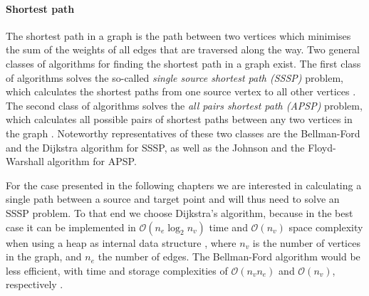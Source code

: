 \paragraph{Shortest path}
The shortest path in a graph is the path between two vertices which minimises the sum of the weights
of all edges that are traversed along the way.
Two general classes of algorithms for finding the shortest path in a graph exist.
The first class of algorithms solves the so-called \textit{single source shortest path (SSSP)} problem,
which calculates the shortest paths from one source vertex to all other vertices \cite[pp. 273-297]{Erickson2019}.
The second class of algorithms solves the \textit{all pairs shortest path (APSP)} problem, which calculates
all possible pairs of shortest paths between any two vertices in the graph \cite[pp. 309-320]{Erickson2019}.
Noteworthy representatives of these two classes are the Bellman-Ford \cite[pp. 11-14]{FUH_algo_graphs_2021} 
and the Dijkstra algorithm \cite[pp. 14-18]{FUH_algo_graphs_2021} for SSSP, 
as well as the Johnson \cite[pp. 19-21]{FUH_algo_graphs_2021} 
and the Floyd-Warshall algorithm \cite[pp. 21-24]{FUH_algo_graphs_2021} for APSP.

For the case presented in the following chapters we are interested in calculating a single path between 
a source and target point and will thus need to solve an SSSP problem.
To that end we choose Dijkstra's algorithm, because in the best case it can be implemented 
in $\mathcal{O}\left( n_e \log_2 n_v \right)$ time and $\mathcal{O}\left( n_v \right)$ space 
complexity when using a heap as internal data structure \cite[pp. 17-18]{FUH_algo_graphs_2021}, 
where $n_v$ is the number of vertices in the graph, and $n_e$ the number of edges.
The Bellman-Ford algorithm would be less efficient, with time and storage complexities of 
$\mathcal{O}\left( n_v n_e \right)$ and $\mathcal{O}\left( n_v \right)$, respectively 
\cite[pp. 13]{FUH_algo_graphs_2021}.

